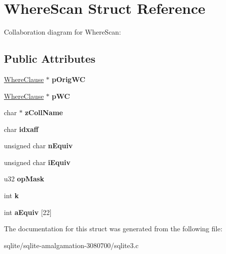\hypertarget{struct_where_scan}{\section{Where\+Scan Struct Reference}
\label{struct_where_scan}
}


Collaboration diagram for Where\+Scan\+:
\subsection*{Public Attributes}
\begin{DoxyCompactItemize}
\item 
\hypertarget{struct_where_scan_a848dc138a80d4e16ce5044e3d3125831}{\hyperlink{struct_where_clause}{Where\+Clause} $\ast$ {\bfseries p\+Orig\+W\+C}}\label{struct_where_scan_a848dc138a80d4e16ce5044e3d3125831}

\item 
\hypertarget{struct_where_scan_a255e78bbf5eb2aafe98d5f0285c1987c}{\hyperlink{struct_where_clause}{Where\+Clause} $\ast$ {\bfseries p\+W\+C}}\label{struct_where_scan_a255e78bbf5eb2aafe98d5f0285c1987c}

\item 
\hypertarget{struct_where_scan_ac23fef9359c0ef8c3837f492fb72eb5b}{char $\ast$ {\bfseries z\+Coll\+Name}}\label{struct_where_scan_ac23fef9359c0ef8c3837f492fb72eb5b}

\item 
\hypertarget{struct_where_scan_ada63a4e977c20a66b858e4b182ff8f87}{char {\bfseries idxaff}}\label{struct_where_scan_ada63a4e977c20a66b858e4b182ff8f87}

\item 
\hypertarget{struct_where_scan_a80ee79b4e2809c0310a892e93ba5dcfe}{unsigned char {\bfseries n\+Equiv}}\label{struct_where_scan_a80ee79b4e2809c0310a892e93ba5dcfe}

\item 
\hypertarget{struct_where_scan_a52812709e4b6257a3084dd091ddaf568}{unsigned char {\bfseries i\+Equiv}}\label{struct_where_scan_a52812709e4b6257a3084dd091ddaf568}

\item 
\hypertarget{struct_where_scan_a52f27b144ffed79df3400868e52dd583}{u32 {\bfseries op\+Mask}}\label{struct_where_scan_a52f27b144ffed79df3400868e52dd583}

\item 
\hypertarget{struct_where_scan_a51bec89116185e0a611cd4d7fed8847c}{int {\bfseries k}}\label{struct_where_scan_a51bec89116185e0a611cd4d7fed8847c}

\item 
\hypertarget{struct_where_scan_a2e14098c4d83012270262f747f13ca8f}{int {\bfseries a\+Equiv} \mbox{[}22\mbox{]}}\label{struct_where_scan_a2e14098c4d83012270262f747f13ca8f}

\end{DoxyCompactItemize}


The documentation for this struct was generated from the following file\+:\begin{DoxyCompactItemize}
\item 
sqlite/sqlite-\/amalgamation-\/3080700/sqlite3.\+c\end{DoxyCompactItemize}
